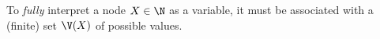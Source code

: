 {{%
To \emph{fully} interpret a node $X \in \N$ as a variable, it must
be
%
associated with a (finite) set $\V(X)$
of possible values.
}}
